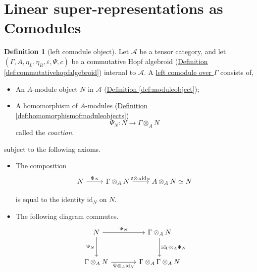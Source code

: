 \documentclass[a4paper]{report}
\newcommand{\defn}[1]{\ul{#1}}
\theoremstyle{definition}
\newtheorem{definition}{Definition}[section]
\theoremstyle{plain}
\theoremstyle{remark}
\begin{document}
\section{Linear super-representations as Comodules}
\begin{definition}[left comodule object]
  \label{def:leftcomoduleobject} 
  Let $\mathscr{A}$ be a tensor category, and let $(\Gamma, A, \eta_{L}, \eta_{R}, \varepsilon, \Psi, c)$ be a commutative Hopf algebroid (\hyperref[def:commutativehopfalgebroid]{Definition \ref*{def:commutativehopfalgebroid}}) internal to $\mathscr{A}$. A \defn{left comodule over $\Gamma$} consists of,
  \begin{itemize}
    \item An $A$-module object $N$ in $\mathscr{A}$ (\hyperref[def:moduleobject]{Definition \ref*{def:moduleobject}});

    \item A homomorphism of $A$-modules (\hyperref[def:homomorphismofmoduleobjects]{Definition \ref*{def:homomorphismofmoduleobjects}})
      \begin{equation*}
        \Psi_{N}\colon N \to \Gamma \otimes_{A} N
      \end{equation*}
      called the \emph{coaction}.
  \end{itemize}
  subject to the following axioms.
  \begin{itemize}
    \item The composition
      \begin{equation*}
        \begin{tikzcd}
          N
          \arrow[r, "\Psi_{N}"]
          & \Gamma \otimes_{A} N
          \arrow[r, "\varepsilon \otimes_{A} \mathrm{id}_{N}"]
          & A \otimes_{A} N \simeq N
        \end{tikzcd}
      \end{equation*}

      is equal to the identity $\mathrm{id}_{N}$ on $N$.

    \item The following diagram commutes.
      \begin{equation*}
        \begin{tikzcd}[row sep=large, column sep=large]
          N
          \arrow[r, "\Psi_{N}"]
          \arrow[d, swap, "\Psi_{N}"]
          & \Gamma \otimes_{A} N
          \arrow[d, "\mathrm{id}_{\Gamma} \otimes_{A} \Psi_{N}"]
          \\
          \Gamma \otimes_{A} N
          \arrow[r, swap, "\Psi \otimes_{A} \mathrm{id}_{N}"]
          & \Gamma \otimes_{A} \Gamma \otimes_{A} N
        \end{tikzcd}
      \end{equation*}
  \end{itemize}
\end{definition}
\end{document}
